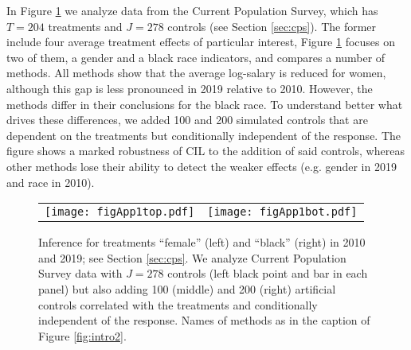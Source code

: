 \documentclass[12pt]{article}
\begin{document}
In Figure \ref{fig:intro1} we analyze data from the Current Population Survey, which has $T=204$ treatments and $J=278$ controls (see Section \ref{sec:cps}). %
The former include four average treatment effects of particular interest, Figure  \ref{fig:intro1} focuses on two of them, a gender and a black race indicators, %
and compares a number of methods.  All methods show that the average log-salary is reduced for women, although this gap is less pronounced in 2019 relative to 2010. However, the methods differ in their conclusions for the black race. To understand better what drives these differences, we added 100 and 200 simulated controls that are dependent on the treatments but conditionally independent of the response. The figure shows a marked robustness of CIL to the addition of said controls, whereas other methods lose their ability to detect the weaker effects (e.g. gender in 2019 and race in 2010). %

\begin{figure}[htbp]
\centering
\begin{tabular}{cc}
\texttt{[image: figApp1top.pdf]} &
\texttt{[image: figApp1bot.pdf]}
\end{tabular}
\caption{Inference for treatments ``female'' (left) and ``black'' (right) in 2010 and 2019; see Section \ref{sec:cps}. We analyze Current Population Survey data with $J=278$ controls (left black point and bar in each panel) but also adding 100 (middle) and 200 (right) artificial controls correlated with the treatments and conditionally independent of  the response. Names of methods as in the caption of Figure \ref{fig:intro2}.}
\label{fig:intro1}
\end{figure}
\end{document}
